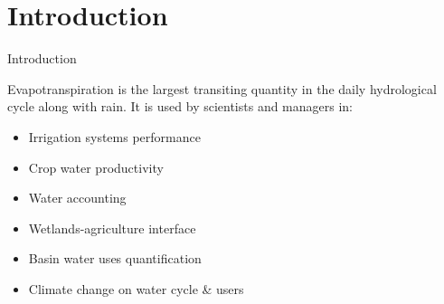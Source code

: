 \documentclass[xcolor=dvipsnames,beamer]{beamer} %
\begin{document}
\section{Introduction}
\begin{frame}[fragile]{Introduction}

Evapotranspiration is the largest transiting quantity in the daily 
hydrological cycle along with rain. It is used by scientists and
managers in:
\newline\linebreak

\begin{itemize}
 \item Irrigation systems performance
 \item Crop water productivity
 \item Water accounting
 \item Wetlands-agriculture interface
 \item Basin water uses quantification
 \item Climate change on water cycle \& users
\end{itemize}
\end{frame}
\end{document}

